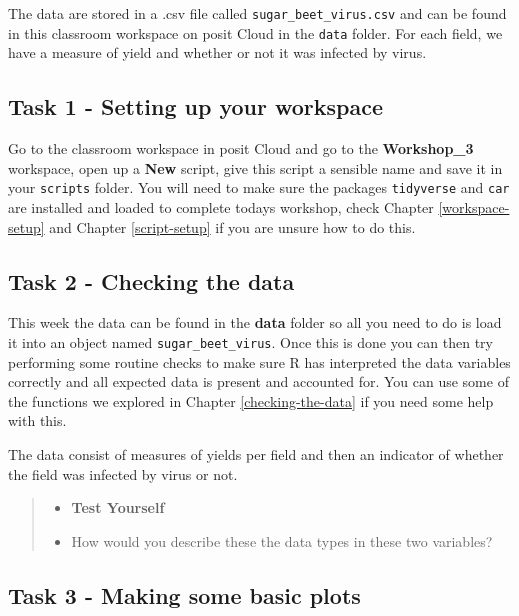 \documentclass[
]{book}
\providecommand{\tightlist}{%
  \setlength{\itemsep}{0pt}\setlength{\parskip}{0pt}}
\begin{document}
The data are stored in a .csv file called \texttt{sugar\_beet\_virus.csv} and can be found in this classroom workspace on posit Cloud in the \texttt{data} folder. For each field, we have a measure of yield and whether or not it was infected by virus.

\subsection{Task 1 - Setting up your workspace}\label{task-1---setting-up-your-workspace}

Go to the classroom workspace in posit Cloud and go to the \textbf{Workshop\_3} workspace, open up a \textbf{New} script, give this script a sensible name and save it in your \texttt{scripts} folder. You will need to make sure the packages \texttt{tidyverse} and \texttt{car} are installed and loaded to complete todays workshop, check Chapter \ref{workspace-setup} and Chapter \ref{script-setup} if you are unsure how to do this.

\subsection{Task 2 - Checking the data}\label{task-2---checking-the-data}

This week the data can be found in the \textbf{data} folder so all you need to do is load it into an object named \texttt{sugar\_beet\_virus}. Once this is done you can then try performing some routine checks to make sure R has interpreted the data variables correctly and all expected data is present and accounted for. You can use some of the functions we explored in Chapter \ref{checking-the-data} if you need some help with this.

The data consist of measures of yields per field and then an indicator of whether the field was infected by virus or not.

\begin{quote}
\begin{itemize}
\tightlist
\item
  \textbf{Test Yourself}
\item
  How would you describe these the data types in these two variables?
\end{itemize}
\end{quote}

\subsection{Task 3 - Making some basic plots}\label{task-3---making-some-basic-plots}
\end{document}
